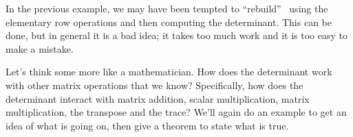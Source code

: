 In the previous example, we may have been tempted to ``rebuild'' \tta\ using the elementary row operations and then computing the determinant. This can be done, but in general it is a bad idea; it takes too much work and it is too easy to make a mistake. 


Let's think some more like a mathematician. How does the determinant work with other matrix operations that we know? Specifically, how does the determinant interact with matrix addition, scalar multiplication, matrix multiplication, the transpose and the trace? We'll again do an example to get an idea of what is going on, then give a theorem to state what is true.\\

